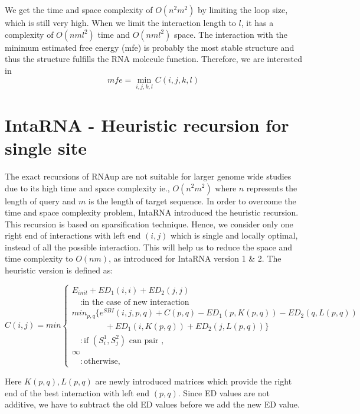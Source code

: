 \documentclass[twoside,a4paper]{report}
\numberwithin{equation}{section}
\begin{document}
	We get the time and space complexity of $O(n^2m^2)$ by limiting the loop size, which is still very high. When we limit the interaction length to $l$, it has a complexity of $O(nml^2)$ time and $O(nml^2)$ space. The interaction with the minimum estimated free energy (mfe) is probably the most stable structure and thus the structure fulfills the RNA molecule function. Therefore, we are interested in \\
	
	 \begin{equation*}
	mfe = \min_{i,j,k,l} C(i,j,k,l)
	\end{equation*}

	
	
	\section{IntaRNA -  Heuristic recursion for single site}
	
	The exact recursions of RNAup are not suitable for larger genome wide studies due to its high time and space complexity ie., $O(n^2m^2)$	where $n$ represents the length of query and $m$ is the length of target sequence. In order to overcome the time and space complexity problem, IntaRNA introduced the heuristic recursion. This recursion is based on sparsification technique. Hence, we consider only one right end of interactions with left end $(i, j)$  which is single and locally optimal, instead of all the possible interaction. This will help us to reduce the space and time complexity to $O(nm)$, as introduced for IntaRNA version 1 \& 2. The heuristic version is defined as:
	
	\begin{equation}
	C(i,j) =  min \begin{cases}
	E_{init} + ED_1(i, i) + ED_2(j, j) \\
	\quad 	: \text{in the case of new interaction}\\
	min_{p,q}\{ e^{SBI}(i,j,p,q)+ C(p,q) - ED_1(p,K(p,q)) - ED_2(q,L(p,q))\\
	\quad \quad \quad \quad + ED_1(i,K(p,q)) + ED_2(j,L(p,q))\} \\
	\quad 	: \text{if $(S_i^1 , S_j^2 )$ can pair },\\
	\infty \\
	\quad : \text{otherwise},
	\end{cases}
	\end{equation}
	
	Here $K(p,q) , L(p,q)$ are newly introduced matrices which provide the right end of the best interaction with left end $(p,q)$. Since ED values are not additive, we have to subtract the old ED values before we add the new ED value.\\
	
\end{document}
